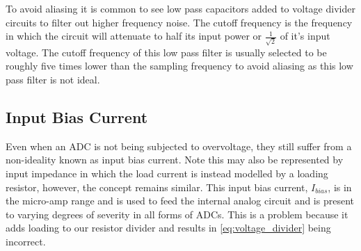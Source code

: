 \documentclass[main.tex]{subfiles}
\begin{document}
\newnoindentpara To avoid aliasing it is common to see low pass capacitors added to voltage divider circuits to filter out higher frequency noise. The cutoff frequency is the frequency in which the circuit will attenuate to half its input power or $\frac{1}{\sqrt{2}}$ of it's input voltage. The cutoff frequency of this low pass filter is usually selected to be roughly five times lower than the sampling frequency to avoid aliasing as this low pass filter is not ideal. 


\subsection{Input Bias Current}
Even when an ADC is not being subjected to overvoltage, they still suffer from a non-ideality known as input bias current. Note this may also be represented by input impedance in which the load current is instead modelled by a loading resistor, however, the concept remains similar. This input bias current, $I_{bias}$, is in the micro-amp range and is used to feed the internal analog circuit and is present to varying degrees of severity in all forms of ADCs. This is a problem because it adds loading to our resistor divider and results in \eqref{eq:voltage_divider} being incorrect. 


%         
\end{document}
